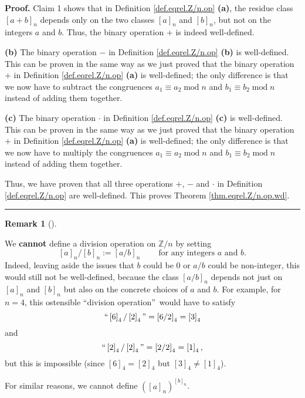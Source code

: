 \documentclass[numbers=enddot,12pt,final,onecolumn,notitlepage]{scrartcl}%
\numberwithin{exer}{subsection}
\theoremstyle{definition}
\newtheorem{remk}[theo]{Remark}
\newenvironment{remark}[1][]
{\begin{remk}[#1]\begin{leftbar}}
{\end{leftbar}\end{remk}}
\newenvironment{proof}[1][Proof]{\noindent\textbf{#1.} }{\ \rule{0.5em}{0.5em}}
\begin{document}
\begin{proof}
Claim 1 shows that in Definition \ref{def.eqrel.Z/n.op} \textbf{(a)}, the
residue class $\left[  a+b\right]  _{n}$ depends only on the two classes
$\left[  a\right]  _{n}$ and $\left[  b\right]  _{n}$, but not on the integers
$a$ and $b$. Thus, the binary operation $+$ is indeed well-defined.

\textbf{(b)} The binary operation $-$ in Definition \ref{def.eqrel.Z/n.op}
\textbf{(b)} is well-defined. This can be proven in the same way as we just
proved that the binary operation $+$ in Definition \ref{def.eqrel.Z/n.op}
\textbf{(a)} is well-defined; the only difference is that we now have to
subtract the congruences $a_{1}\equiv a_{2}\operatorname{mod}n$ and
$b_{1}\equiv b_{2}\operatorname{mod}n$ instead of adding them together.

\textbf{(c)} The binary operation $\cdot$ in Definition \ref{def.eqrel.Z/n.op}
\textbf{(c)} is well-defined. This can be proven in the same way as we just
proved that the binary operation $+$ in Definition \ref{def.eqrel.Z/n.op}
\textbf{(a)} is well-defined; the only difference is that we now have to
multiply the congruences $a_{1}\equiv a_{2}\operatorname{mod}n$ and
$b_{1}\equiv b_{2}\operatorname{mod}n$ instead of adding them together.

Thus, we have proven that all three operations $+$, $-$ and $\cdot$ in
Definition \ref{def.eqrel.Z/n.op} are well-defined. This proves Theorem
\ref{thm.eqrel.Z/n.op.wd}.
\end{proof}

\begin{remark}
We \textbf{cannot} define a division operation on $\mathbb{Z}/n$ by setting%
\[
\left[  a\right]  _{n}/\left[  b\right]  _{n}:=\left[  a/b\right]
_{n}\ \ \ \ \ \ \ \ \ \ \text{for any integers }a\text{ and }b.
\]
Indeed, leaving aside the issues that $b$ could be $0$ or $a/b$ could be
non-integer, this would still not be well-defined, because the class $\left[
a/b\right]  _{n}$ depends not just on $\left[  a\right]  _{n}$ and $\left[
b\right]  _{n}$ but also on the concrete choices of $a$ and $b$. For example,
for $n=4$, this ostensible \textquotedblleft division
operation\textquotedblright\ would have to satisfy
\[
\text{\textquotedblleft}\left[  6\right]  _{4}/\left[  2\right]
_{4}\text{\textquotedblright}=\left[  6/2\right]  _{4}=\left[  3\right]  _{4}%
\]
and%
\[
\text{\textquotedblleft}\left[  2\right]  _{4}/\left[  2\right]
_{4}\text{\textquotedblright}=\left[  2/2\right]  _{4}=\left[  1\right]
_{4},
\]
but this is impossible (since $\left[  6\right]  _{4}=\left[  2\right]  _{4}$
but $\left[  3\right]  _{4}\neq\left[  1\right]  _{4}$).

For similar reasons, we cannot define $\left(  \left[  a\right]  _{n}\right)
^{\left[  b\right]  _{n}}$.
\end{remark}
\end{document}
